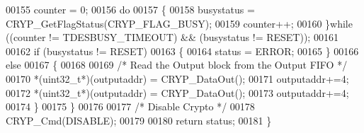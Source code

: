 \begin{DoxyCode}
00155     counter = 0;
00156     \textcolor{keywordflow}{do}
00157     \{
00158       busystatus = CRYP_GetFlagStatus(CRYP_FLAG_BUSY);
00159       counter++;
00160     \}\textcolor{keywordflow}{while} ((counter != TDESBUSY_TIMEOUT) && (busystatus != RESET));
00161 
00162     \textcolor{keywordflow}{if} (busystatus != RESET)
00163     \{
00164        status = ERROR;
00165     \}
00166     \textcolor{keywordflow}{else}
00167     \{
00168 
00169       \textcolor{comment}{/* Read the Output block from the Output FIFO */}
00170       *(uint32\_t*)(outputaddr) = CRYP_DataOut();
00171       outputaddr+=4;
00172       *(uint32\_t*)(outputaddr) = CRYP_DataOut();
00173       outputaddr+=4;
00174     \}
00175   \}
00176 
00177   \textcolor{comment}{/* Disable Crypto */}
00178   CRYP_Cmd(DISABLE);
00179 
00180   \textcolor{keywordflow}{return} status; 
00181 \}
\end{DoxyCode}

